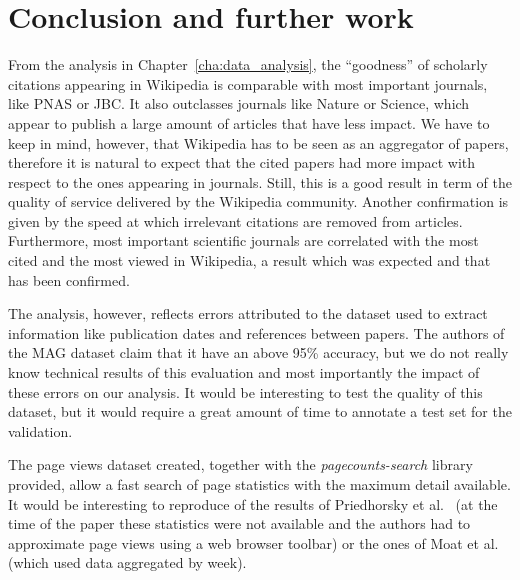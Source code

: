 \cleardoublepage{}
\chapter{Conclusion and further work}
\label{cha:conclusion}
From the analysis in Chapter~\ref{cha:data_analysis}, the ``goodness'' of scholarly citations appearing in Wikipedia is comparable with most important journals, like PNAS or JBC.
It also outclasses journals like Nature or Science, which appear to publish a large amount of articles that have less impact.
We have to keep in mind, however, that Wikipedia has to be seen as an aggregator of papers, therefore it is natural to expect that the cited papers had more impact with respect to the ones appearing in journals.
Still, this is a good result in term of the quality of service delivered by the Wikipedia community.
Another confirmation is given by the speed at which irrelevant citations are removed from articles.
Furthermore, most important scientific journals are correlated with the most cited and the most viewed in Wikipedia, a result which was expected and that has been confirmed.

The analysis, however, reflects errors attributed to the dataset used to extract information like publication dates and references between papers.
The authors of the \ac{MAG} dataset claim that it have an above 95\% accuracy, but we do not really know technical results of this evaluation and most importantly the impact of these errors on our analysis.
It would be interesting to test the quality of this dataset, but it would require a great amount of time to annotate a test set for the validation.

The page views dataset created, together with the \emph{pagecounts-search} library provided, allow a fast search of page statistics with the maximum detail available.
It would be interesting to reproduce of the results of Priedhorsky et al.~\cite{Priedhorsky2007} (at the time of the paper these statistics were not available and the authors had to approximate page views using a web browser toolbar)
or the ones of Moat et al.~\cite{Moat2013} (which used data aggregated by week).
